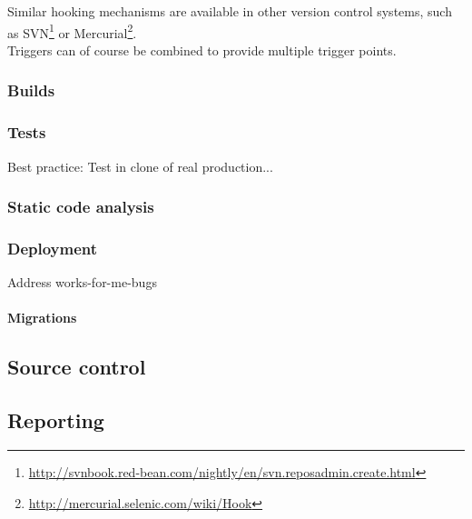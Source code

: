 Similar hooking mechanisms are available in other version control systems, such
as
SVN\footnote{\url{http://svnbook.red-bean.com/nightly/en/svn.reposadmin.create.html}}
or Mercurial\footnote{\url{http://mercurial.selenic.com/wiki/Hook}}.\\

Triggers can of course be combined to provide multiple trigger points.


\subsubsection{Builds}\label{sec:builds}

\subsubsection{Tests}\label{sec:tests}

Best practice: Test in clone of real production...

\subsubsection{Static code analysis}\label{sec:static-code-analysis}

\subsubsection{Deployment}\label{sec:deployment}

Address works-for-me-bugs

\paragraph{Migrations}\label{sec:migrations}

\subsection{Source control}\label{sec:source-control}

\subsection{Reporting}\label{sec:reporting}

